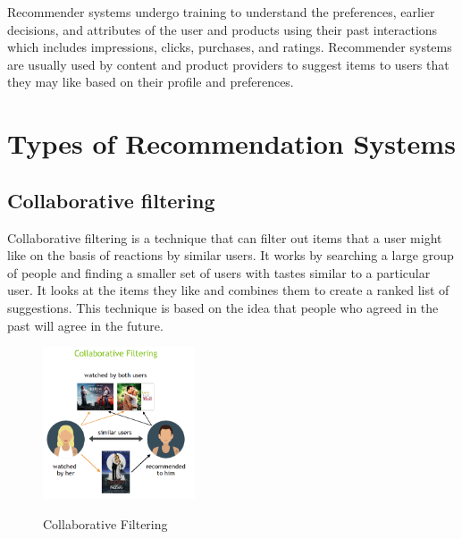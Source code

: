 Recommender systems undergo training to understand the preferences, earlier decisions, and attributes of the user and products using their past interactions which includes impressions, clicks, purchases, and ratings. Recommender systems are usually used by content and product providers to suggest items to users that they may like based on their profile and preferences. 

\section{Types of Recommendation Systems}\label{sec:types-of-recommendation-systems}
\subsection{Collaborative filtering}\label{subsec:collaborative-filtering}
Collaborative filtering is a technique that can filter out items that a user might like on the basis of reactions by similar users. It works by searching a large group of people and finding a smaller set of users with tastes similar to a particular user. It looks at the items they like and combines them to create a ranked list of suggestions. This technique is based on the idea that people who agreed in the past will agree in the future.
\begin{figure}[H]
    \centering
    \includegraphics[width=0.4\textwidth]{assets/collaborative_filtering.png}
    \caption{Collaborative Filtering}
    \label{fig:collaborative-filtering}
    \cite{NvidiaRecSys}
\end{figure}

